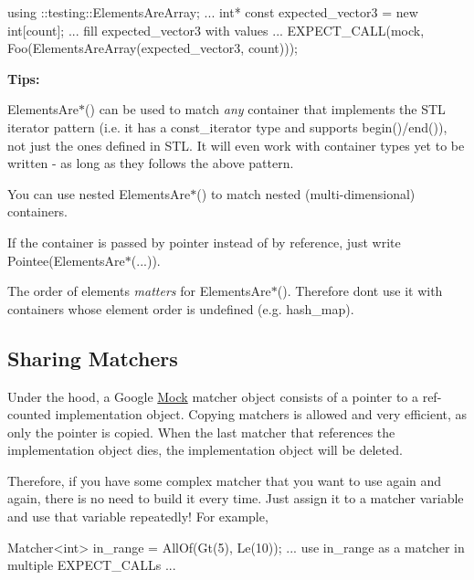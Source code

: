 \begin{DoxyCode}
using ::testing::ElementsAreArray;
...
  \textcolor{keywordtype}{int}* \textcolor{keyword}{const} expected\_vector3 = \textcolor{keyword}{new} \textcolor{keywordtype}{int}[count];
  ... fill expected\_vector3 with values ...
  EXPECT\_CALL(mock, Foo(ElementsAreArray(expected\_vector3, count)));
\end{DoxyCode}


{\bfseries Tips\+:}


\begin{DoxyItemize}
\item {\ttfamily Elements\+Are$\ast$()} can be used to match {\itshape any} container that implements the S\+TL iterator pattern (i.\+e. it has a {\ttfamily const\+\_\+iterator} type and supports {\ttfamily begin()/end()}), not just the ones defined in S\+TL. It will even work with container types yet to be written -\/ as long as they follows the above pattern.
\item You can use nested {\ttfamily Elements\+Are$\ast$()} to match nested (multi-\/dimensional) containers.
\item If the container is passed by pointer instead of by reference, just write {\ttfamily Pointee(Elements\+Are$\ast$(...))}.
\item The order of elements {\itshape matters} for {\ttfamily Elements\+Are$\ast$()}. Therefore don\textquotesingle{}t use it with containers whose element order is undefined (e.\+g. {\ttfamily hash\+\_\+map}).
\end{DoxyItemize}

\subsection*{Sharing Matchers}

Under the hood, a Google \hyperlink{classMock}{Mock} matcher object consists of a pointer to a ref-\/counted implementation object. Copying matchers is allowed and very efficient, as only the pointer is copied. When the last matcher that references the implementation object dies, the implementation object will be deleted.

Therefore, if you have some complex matcher that you want to use again and again, there is no need to build it every time. Just assign it to a matcher variable and use that variable repeatedly! For example,


\begin{DoxyCode}
Matcher<int> in\_range = AllOf(Gt(5), Le(10));
... use in\_range as a matcher in multiple EXPECT\_CALLs ...
\end{DoxyCode}


